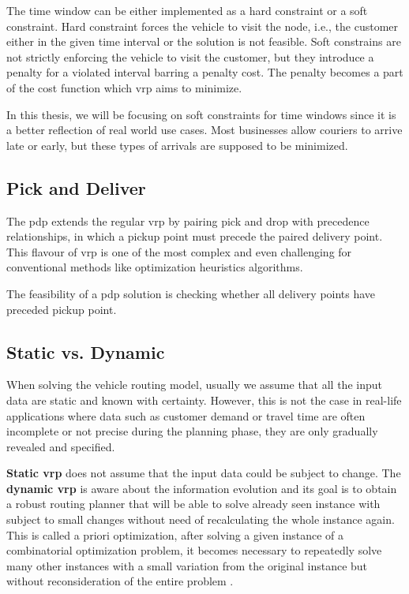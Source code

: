     The time window can be either implemented as a hard constraint or a soft constraint. Hard constraint forces the vehicle to visit the node, i.e., the customer either in the given time interval or the solution is not feasible. Soft constrains are not strictly enforcing the vehicle to visit the customer, but they introduce a penalty for a violated interval barring a penalty cost. The penalty becomes a part of the cost function which \gls{vrp} aims to minimize.
    
    In this thesis, we will be focusing on soft constraints for time windows since it is a better reflection of real world use cases. Most businesses allow couriers to arrive late or early, but these types of arrivals are supposed to be minimized.
    
    \subsection{Pick and Deliver}\label{pick-and-delivery}
    The \gls{pdp} extends the regular \gls{vrp} by pairing pick and drop with precedence relationships, in which a pickup point must precede the paired delivery point. This flavour of \gls{vrp} is one of the most complex and even challenging for conventional methods like optimization heuristics algorithms.
    
    The feasibility of a \gls{pdp} solution is checking whether all delivery points have preceded pickup point.
    
    \subsection{Static vs. Dynamic}\label{dynamic}
    When solving the vehicle routing model, usually we assume that all the input data are static and known with certainty. However, this is not the case in real-life applications where data such as customer demand or travel time are often incomplete or not precise during the planning phase, they are only gradually revealed and specified.
    
    \textbf{Static \gls{vrp}} does not assume that the input data could be subject to change. The \textbf{dynamic \gls{vrp}} is aware about the information evolution\cite{psaraftis} and its goal is to obtain a robust routing planner that will be able to solve already seen instance with subject to small changes without need of recalculating the whole instance again. This is called a priori optimization, after solving a given instance of a combinatorial optimization problem, it becomes necessary to repeatedly solve many other instances with a small variation from the original instance but without reconsideration of the entire problem \cite{apriori-optimization}.
    

